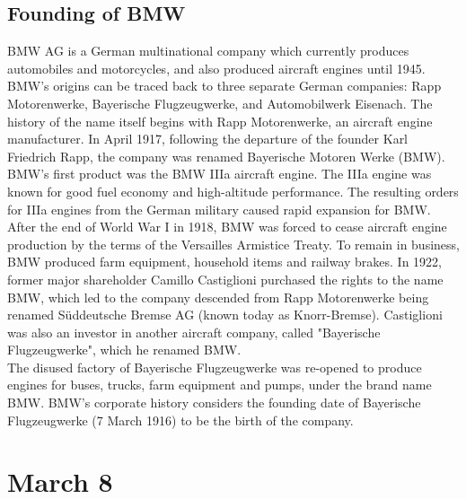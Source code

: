 \documentclass[11pt]{report}
\begin{document}
\subsection{Founding of BMW}
BMW AG is a German multinational company which currently produces automobiles and motorcycles, and also produced aircraft engines until 1945.\\ \indent BMW's origins can be traced back to three separate German companies: Rapp Motorenwerke, Bayerische Flugzeugwerke, and Automobilwerk Eisenach. The history of the name itself begins with Rapp Motorenwerke, an aircraft engine manufacturer. In April 1917, following the departure of the founder Karl Friedrich Rapp, the company was renamed Bayerische Motoren Werke (BMW). BMW's first product was the BMW IIIa aircraft engine. The IIIa engine was known for good fuel economy and high-altitude performance. The resulting orders for IIIa engines from the German military caused rapid expansion for BMW.\\
\indent After the end of World War I in 1918, BMW was forced to cease aircraft engine production by the terms of the Versailles Armistice Treaty. To remain in business, BMW produced farm equipment, household items and railway brakes. In 1922, former major shareholder Camillo Castiglioni purchased the rights to the name BMW, which led to the company descended from Rapp Motorenwerke being renamed Süddeutsche Bremse AG (known today as Knorr-Bremse). Castiglioni was also an investor in another aircraft company, called "Bayerische Flugzeugwerke", which he renamed BMW.\\ \indent The disused factory of Bayerische Flugzeugwerke was re-opened to produce engines for buses, trucks, farm equipment and pumps, under the brand name BMW. BMW's corporate history considers the founding date of Bayerische Flugzeugwerke (7 March 1916) to be the birth of the company.
\section{March 8}
\end{document}
